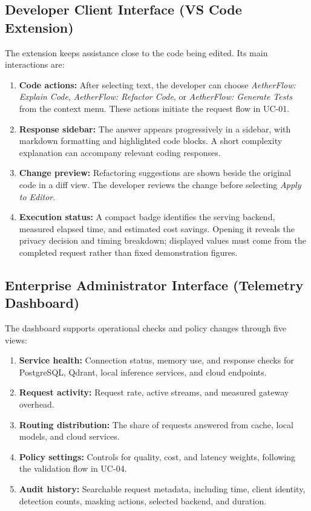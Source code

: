 \subsection{Developer Client Interface (VS Code Extension)}

The extension keeps assistance close to the code being edited. Its main interactions are:
\begin{enumerate}
    \item \textbf{Code actions:} After selecting text, the developer can choose \textit{AetherFlow: Explain Code}, \textit{AetherFlow: Refactor Code}, or \textit{AetherFlow: Generate Tests} from the context menu. These actions initiate the request flow in UC-01.
    \item \textbf{Response sidebar:} The answer appears progressively in a sidebar, with markdown formatting and highlighted code blocks. A short complexity explanation can accompany relevant coding responses.
    \item \textbf{Change preview:} Refactoring suggestions are shown beside the original code in a diff view. The developer reviews the change before selecting \textit{Apply to Editor}.
    \item \textbf{Execution status:} A compact badge identifies the serving backend, measured elapsed time, and estimated cost savings. Opening it reveals the privacy decision and timing breakdown; displayed values must come from the completed request rather than fixed demonstration figures.
\end{enumerate}

\subsection{Enterprise Administrator Interface (Telemetry Dashboard)}

The dashboard supports operational checks and policy changes through five views:
\begin{enumerate}
    \item \textbf{Service health:} Connection status, memory use, and response checks for PostgreSQL, Qdrant, local inference services, and cloud endpoints.
    \item \textbf{Request activity:} Request rate, active streams, and measured gateway overhead.
    \item \textbf{Routing distribution:} The share of requests answered from cache, local models, and cloud services.
    \item \textbf{Policy settings:} Controls for quality, cost, and latency weights, following the validation flow in UC-04.
    \item \textbf{Audit history:} Searchable request metadata, including time, client identity, detection counts, masking actions, selected backend, and duration.
\end{enumerate}

